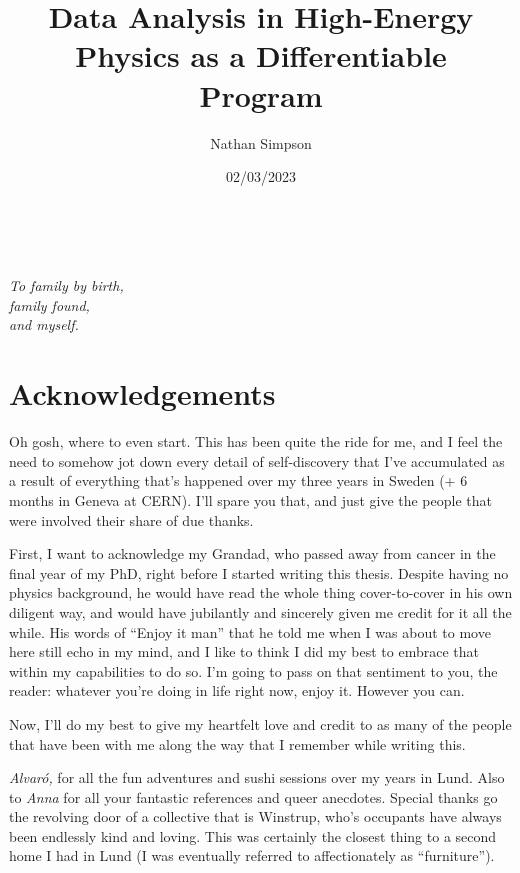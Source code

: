 \documentclass[
  11pt,
  numbers=noendperiod]{book}
\title{Data Analysis in High-Energy Physics as a Differentiable Program}
\author{Nathan Simpson}
\date{02/03/2023}
\begin{document}


\newpage
\thispagestyle{empty} %
~
\vspace{140pt}
\begin{flushright}
\textit{To family by birth,\\family found,\\and myself.}
\end{flushright}

\newpage
\thispagestyle{empty} %

\section*{Acknowledgements}

Oh gosh, where to even start. This has been quite the ride for me, and I feel the need to somehow jot down every detail of self-discovery that I've accumulated as a result of everything that's happened over my three years in Sweden (+ 6 months in Geneva at CERN). I'll spare you that, and just give the people that were involved their share of due thanks.

First, I want to acknowledge my Grandad, who passed away from cancer in the final year of my PhD, right before I started writing this thesis. Despite having no physics background, he would have read the whole thing cover-to-cover in his own diligent way, and would have jubilantly and sincerely given me credit for it all the while. His words of ``Enjoy it man'' that he told me when I was about to move here still echo in my mind, and I like to think I did my best to embrace that within my capabilities to do so. I'm going to pass on that sentiment to you, the reader: whatever you're doing in life right now, enjoy it. However you can.

Now, I'll do my best to give my heartfelt love and credit to as many of the people that have been with me along the way that I remember while writing this.

\textit{Alvaró,} for all the fun adventures and sushi sessions over my years in Lund. Also to \textit{Anna} for all your fantastic references and queer anecdotes. Special thanks go the revolving door of a collective that is Winstrup, who's occupants have always been endlessly kind and loving. This was certainly the closest thing to a second home I had in Lund (I was eventually referred to affectionately as ``furniture'').
\end{document}

